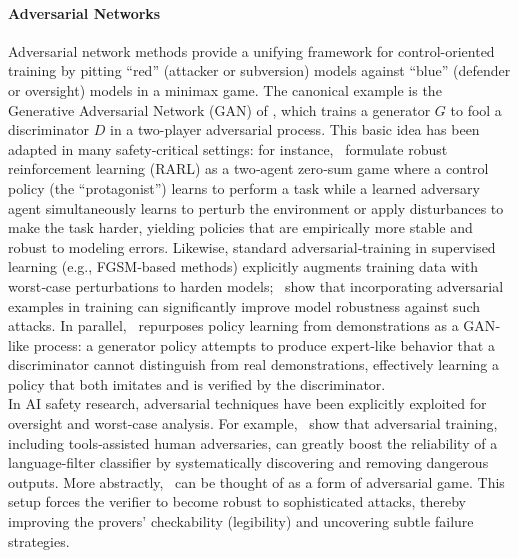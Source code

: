 \paragraph{Adversarial Networks} Adversarial network methods provide a unifying framework for control-oriented training by pitting ``red'' (attacker or subversion) models against ``blue'' (defender or oversight) models in a minimax game. The canonical example is the Generative Adversarial Network (GAN) of \cite{goodfellow2014generative}, which trains a generator $G$ to fool a discriminator $D$ in a two-player adversarial process.  This basic idea has been adapted in many safety‐critical settings: for instance,~\citet{pinto2017robust} formulate robust reinforcement learning (RARL) as a two‐agent zero‐sum game where a control policy (the ``protagonist'') learns to perform a task while a learned adversary agent simultaneously learns to perturb the environment or apply disturbances to make the task harder, yielding policies that are empirically more stable and robust to modeling errors. Likewise, standard adversarial‐training in supervised learning (e.g., FGSM‐based methods) explicitly augments training data with worst‐case perturbations to harden models;~\citet{goodfellow2014explaining} show that incorporating adversarial examples in training can significantly improve model robustness against such attacks. In parallel,~\citet{ho2016generative} repurposes policy learning from demonstrations as a GAN‐like process: a generator policy attempts to produce expert‐like behavior that a discriminator cannot distinguish from real demonstrations, effectively learning a policy that both imitates and is verified by the discriminator.
\\
In AI safety research, adversarial techniques have been explicitly exploited for oversight and worst‐case analysis. For example,~\citet{ziegler2022adversarial} show that adversarial training, including tools‐assisted human adversaries, can greatly boost the reliability of a language-filter classifier by systematically discovering and removing dangerous outputs. More abstractly,~\citet{kirchner2024prover} can be thought of as a form of adversarial game. This setup forces the verifier to become robust to sophisticated attacks, thereby improving the provers’ checkability (legibility) and uncovering subtle failure strategies.

